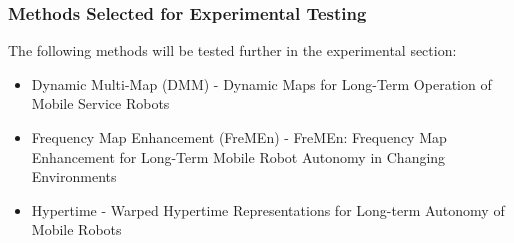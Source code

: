   \subsubsection{ Methods Selected for Experimental Testing }
  The following methods will be tested further in the experimental section:
  \begin{itemize}
    \item Dynamic Multi-Map (DMM) - Dynamic Maps for Long-Term Operation of Mobile Service Robots \cite{Biber2005}
    \item Frequency Map Enhancement (FreMEn) - FreMEn: Frequency Map Enhancement for Long-Term Mobile Robot Autonomy in Changing Environments \cite{Krajnik2015}
    \item Hypertime - Warped Hypertime Representations for Long-term Autonomy of Mobile Robots \cite{Krajnik2018}
  \end{itemize}


